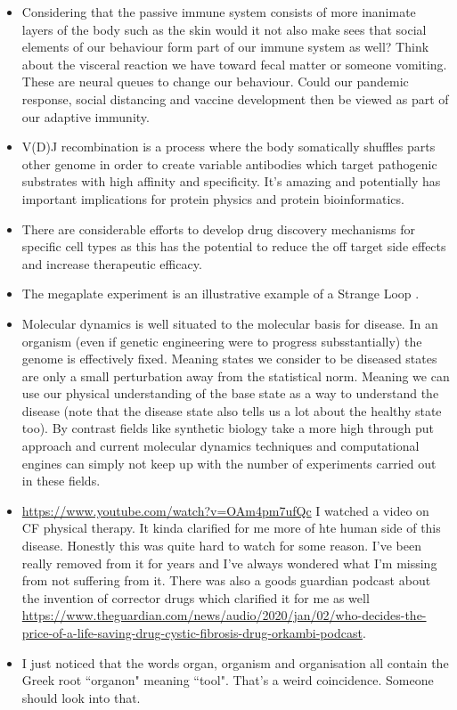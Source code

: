 \begin{itemize}
\item Considering that the passive immune system consists of more inanimate layers of the body such as the skin would it not also make sees that social elements of our behaviour form part of our immune system as well? Think about the visceral reaction we have toward fecal matter or someone vomiting. These are neural queues to change our behaviour. Could our pandemic response, social distancing and vaccine development then be viewed as part of our adaptive immunity. 

\item V(D)J recombination is a process where the body somatically shuffles parts other genome in order to create variable antibodies which target pathogenic substrates with high affinity and specificity. It's amazing and potentially has important implications for protein physics and protein bioinformatics.

\item There are considerable efforts to develop drug discovery mechanisms for specific cell types \cite{yu2020} as this has the potential to reduce the off target side effects and increase therapeutic efficacy. 

\item The megaplate experiment\cite{baym2016} is an illustrative example of a Strange Loop \cite{hofstadter2007}. 

\item Molecular dynamics is well situated to the molecular basis for disease. In an organism (even if genetic engineering were to progress subsstantially) the genome is effectively fixed. Meaning states we consider to be diseased states are only a small perturbation away from the statistical norm. Meaning we can use our physical understanding of the base state as a way to understand the disease (note that the disease state also tells us a lot about the healthy state too). By contrast fields like synthetic biology take a more high through put approach and current molecular dynamics techniques and computational engines can simply not keep up with the number of experiments carried out in these fields.  

\item \href{https://www.youtube.com/watch?v=OAm4pm7ufQc}{https://www.youtube.com/watch?v=OAm4pm7ufQc} I watched a video on CF physical therapy. It kinda clarified for me more of hte human side of this disease. Honestly this was quite hard to watch for some reason. I've been really removed from it for years and I've always wondered what I'm missing from not suffering from it. There was also a goods guardian podcast about the invention of corrector drugs which clarified it for me as well \href{https://www.theguardian.com/news/audio/2020/jan/02/who-decides-the-price-of-a-life-saving-drug-cystic-fibrosis-drug-orkambi-podcast}{https://www.theguardian.com/news/audio/2020/jan/02/who-decides-the-price-of-a-life-saving-drug-cystic-fibrosis-drug-orkambi-podcast}.
\item I just noticed that the words organ, organism and organisation all contain the Greek root ``organon" meaning ``tool". That's a weird coincidence. Someone should look into that. 
\end{itemize}
